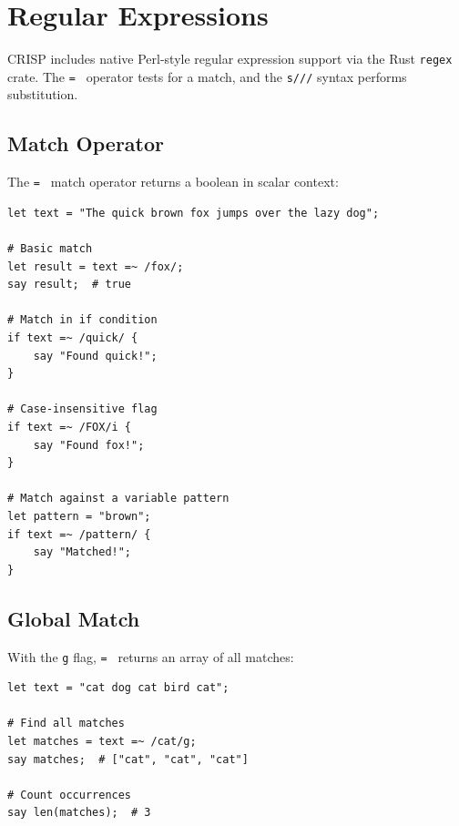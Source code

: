 \section{Regular Expressions}

CRISP includes native Perl-style regular expression support via the Rust \texttt{regex} crate. The \texttt{=~} operator tests for a match, and the \texttt{s///} syntax performs substitution.

\subsection{Match Operator}

The \texttt{=~} match operator returns a boolean in scalar context:

\begin{tcolorbox}[colback=codebg, colframe=darkpurple, colbacktitle=darkpurple, title=\textbf{\textcolor{codegold}{Regex Match}}, fonttitle=\bfseries, sharp corners]
\begin{lstlisting}
let text = "The quick brown fox jumps over the lazy dog";

# Basic match
let result = text =~ /fox/;
say result;  # true

# Match in if condition
if text =~ /quick/ {
    say "Found quick!";
}

# Case-insensitive flag
if text =~ /FOX/i {
    say "Found fox!";
}

# Match against a variable pattern
let pattern = "brown";
if text =~ /pattern/ {
    say "Matched!";
}
\end{lstlisting}
\end{tcolorbox}

\subsection{Global Match}

With the \texttt{g} flag, \texttt{=~} returns an array of all matches:

\begin{tcolorbox}[colback=codebg, colframe=darkpurple, colbacktitle=darkpurple, title=\textbf{\textcolor{codegold}{Global Match}}, fonttitle=\bfseries, sharp corners]
\begin{lstlisting}
let text = "cat dog cat bird cat";

# Find all matches
let matches = text =~ /cat/g;
say matches;  # ["cat", "cat", "cat"]

# Count occurrences
say len(matches);  # 3
\end{lstlisting}
\end{tcolorbox}

